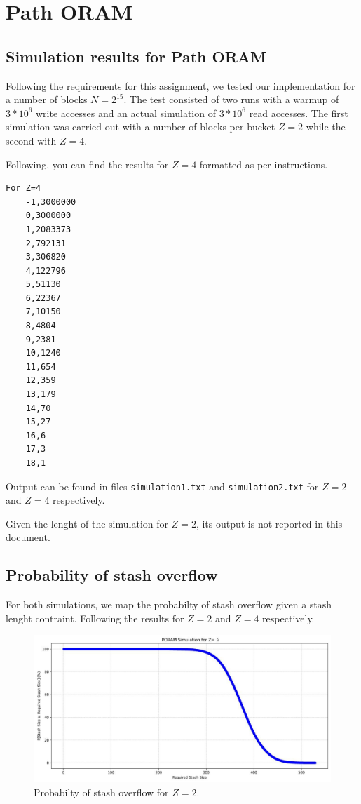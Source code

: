 \section{Path ORAM}

\subsection{Simulation results for Path ORAM}

Following the requirements for this assignment, we tested our implementation for a number of blocks $N=2^{15}$. The test consisted of two runs with a warmup of $3*10^6$ write accesses and an actual simulation of $3*10^6$ read accesses. The first simulation was carried out with a number of blocks per bucket $Z=2$ while the second with $Z=4$.

Following, you can find the results for $Z=4$ formatted as per instructions.

\begin{verbatim}
For Z=4
    -1,3000000
    0,3000000
    1,2083373
    2,792131
    3,306820
    4,122796
    5,51130
    6,22367
    7,10150
    8,4804
    9,2381
    10,1240
    11,654
    12,359
    13,179
    14,70
    15,27
    16,6
    17,3
    18,1
\end{verbatim}

Output can be found in files \texttt{simulation1.txt} and \texttt{simulation2.txt} for $Z=2$ and $Z=4$ respectively.

Given the lenght of the simulation for $Z=2$, its output is not reported in this document.

\subsection{Probability of stash overflow}

For both simulations, we map the probabilty of stash overflow given a stash lenght contraint. Following the results for $Z=2$ and $Z=4$ respectively.

\begin{figure}[H]
    \centering
    \includegraphics[width=\textwidth]{02-ex1/plot_z_2.png}
    \caption{Probabilty of stash overflow for $Z=2$.}
    \label{fig:stash-overflow-for-Z=2}
\end{figure}

